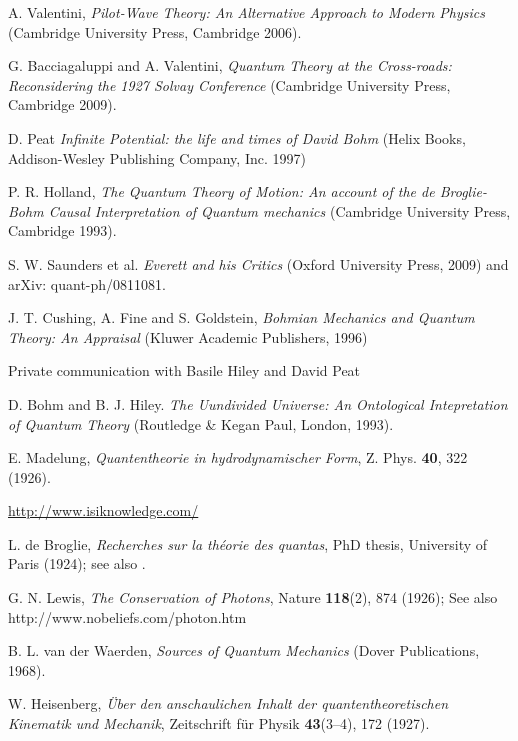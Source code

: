 \documentclass[nofootinbib, secnumarabic, amsmath, nobibnotes,10pt,aps,pra]{revtex4-1}
\begin{document}
\begin{thebibliography}{999}
A. Valentini, \emph{Pilot-Wave Theory: An Alternative Approach to Modern Physics} (Cambridge University Press, Cambridge 2006).

G. Bacciagaluppi and A. Valentini, \emph{Quantum Theory at the Cross-roads: Reconsidering the 1927 Solvay Conference} (Cambridge University Press, Cambridge 2009).

D. Peat \emph{Infinite Potential: the life and times of David Bohm} (Helix Books, Addison-Wesley Publishing Company, Inc. 1997)

P. R. Holland, \emph{The Quantum Theory of Motion: An account of the de Broglie-Bohm Causal Interpretation of Quantum mechanics}  (Cambridge University Press, Cambridge 1993).

S. W. Saunders et al. \emph{Everett and his Critics} (Oxford University Press, 2009) and arXiv: quant-ph/0811081.

J. T. Cushing, A. Fine and S. Goldstein, \emph{Bohmian Mechanics and Quantum Theory: An Appraisal}  (Kluwer Academic Publishers, 1996)

Private communication with Basile Hiley and David Peat

D. Bohm and B. J. Hiley. \emph{The Uundivided Universe: An Ontological Intepretation of Quantum Theory} (Routledge \& Kegan Paul, London, 1993).

E. Madelung, \emph{Quantentheorie in hydrodynamischer Form}, Z. Phys. \textbf{40},  322 (1926).

\url{http://www.isiknowledge.com/}


L. de Broglie, \emph{Recherches sur la th\'{e}orie des quantas}, PhD
thesis, University of Paris (1924); see also \cite{om.dB_AnnPhys}.


G. N. Lewis, \emph{The Conservation of Photons}, Nature \textbf{118}(2),  874 (1926); See also http://www.nobeliefs.com/photon.htm

B. L. van der Waerden, \emph{Sources of Quantum Mechanics} (Dover Publications, 1968).

W. Heisenberg, \emph{\"{U}ber den anschaulichen Inhalt der quantentheoretischen Kinematik und Mechanik}, Zeitschrift f\"{u}r Physik \textbf{43}(3--4),  172 (1927).


\end{thebibliography}
\end{document}
